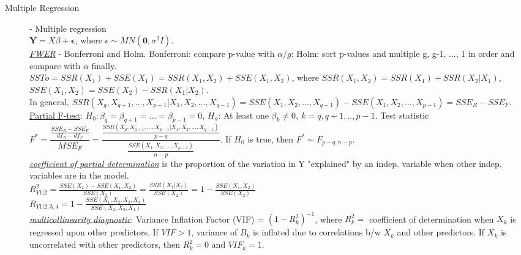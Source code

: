 \documentclass[10pt,landscape]{article}
\begin{document}
\begin{multicols}{3}
    \begin{description}
    		\item[Multiple Regression] - Multiple regression \\ %
    		$\boldsymbol{Y} = X\beta+\boldsymbol{\epsilon}$, where $\epsilon \sim MN(\boldsymbol{0}, \sigma^2I)$. \\    		
		\underline{\textit{FWER}} - Bonferroni and Holm. Bonferroni: compare p-value with $\alpha / g$; Holm: sort p-values and multiple g, g-1, ..., 1 in order and compare with $\alpha$ finally. \\
		$SSTo = SSR(X_1) + SSE(X_1) = SSR(X_1, X_2) + SSE(X_1, X_2)$, where $SSR(X_1, X_2) = SSR(X_1) + SSR(X_2|X_1)$, $SSE(X_1,  X_2) = SSE(X_2) - SSR(X_1|X_2)$.\\
		In general,  $SSR(X_q, X_{q+1},..., X_{p-1}|X_1, X_2,...,X_{q-1}) = SSE(X_1, X_2,...,X_{q-1}) - SSE(X_1, X_2, ...,X_{p-1}) = SSE_R - SSE_F$.\\
		\underline{Partial F-test}: $H_0: \beta_q = \beta_{q+1} = ... = \beta_{p-1} = 0$, $H_a$: At least one $\beta_k \neq 0,\ k = q, q+1, .., p-1$. Test statistic $F^* = \dfrac{\frac{SSE_R - SSE_F}{df_R - df_F}}{MSE_F} = \dfrac{\frac{SSR(X_q, X_{q+1}, ..., X_{p-1} | X_1, X_2, ..., X_{q-1})}{p-q}}{\frac{SSE(X_1, X_2, ..., X_{p-1})}{n-p}} $. If $H_0$ is true, then $F^* \sim F_{p-q, n-p}$.\\
		\underline{\textit{coefficient of partial determination}} is the proportion of the variation in Y "explained" by an indep. variable when other indep. variables are in the model. \\
		$R_{Y1|2}^2 = \frac{SSE(X_2) - SSE(X_1, X_2)}{SSE(X_2)} = \frac{SSR(X_1|X_2)}{SSE(X_2)} = 1 - \frac{SSE(X_1, X_2)}{SSE(X_2)}$ \\
		$R_{Y1|2,3,4} = 1 - \frac{SSE(X_1, X_2, X_3, X_4)}{SSE(X_2, X_3, X_4)}$\\
		\underline{\textit{multicollinearity diagnostic}}: Variance Inflation Factor (VIF) = $(1 - R_k^2)^{-1}$, where $R_k^2=$ coefficient of determination when $X_k$ is regressed upon other predictors. If $VIF>1$, variance of $B_k$ is inflated due to correlations b/w $X_k$ and other predictors. 	If $X_k$ is uncorrelated with other predictors, then $R_k^2 = 0$ and $VIF_k = 1$. \\ 
		
		
    		
    \end{description}    
    

\end{multicols}
\end{document}
